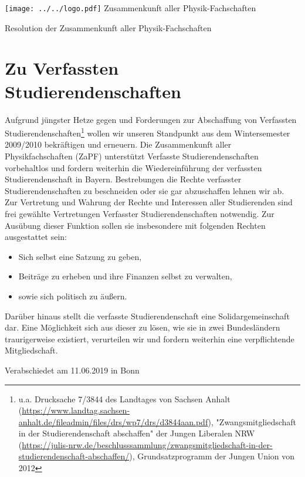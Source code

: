\documentclass[DIV=calc]{scrartcl}
\begin{document}
    \hspace{0.87\textwidth}
    \begin{minipage}{120pt}
        \vspace{-1.8cm}
        \texttt{[image: ../../logo.pdf]}
        \centering
        \small Zusammenkunft aller Physik-Fachschaften
    \end{minipage}
    \begin{center}
        \huge{Resolution der Zusammenkunft aller Physik-Fachschaften}\vspace{.25\baselineskip}\\
        \normalsize
    \end{center}
    \vspace{1cm}

\section*{Zu Verfassten Studierendenschaften}
Aufgrund jüngster Hetze gegen und Forderungen zur Abschaffung von Verfassten Studierendenschaften\footnote{u.a. Drucksache 7/3844 des Landtages von Sachsen Anhalt (\url{https://www.landtag.sachsen-anhalt.de/fileadmin/files/drs/wp7/drs/d3844aan.pdf}), "Zwangsmitgliedschaft in der Studierendenschaft abschaffen" der Jungen Liberalen NRW (\url{https://julis-nrw.de/beschlusssammlung/zwangsmitgliedschaft-in-der-studierendenschaft-abschaffen/}), Grundsatzprogramm der Jungen Union von 2012} wollen wir unseren Standpunkt aus dem Wintersemester 2009/2010 bekräftigen und erneuern.
Die Zusammenkunft aller Physikfachschaften (ZaPF) unterstützt Verfasste Studierendenschaften vorbehaltlos und fordern weiterhin die Wiedereinführung der verfassten Studierendenschaft in Bayern.
Bestrebungen die Rechte verfasster Studierendenschaften zu beschneiden oder sie gar abzuschaffen lehnen wir ab.\\

Zur Vertretung und Wahrung der Rechte und Interessen aller Studierenden sind frei gewählte Vertretungen
Verfasster Studierendenschaften notwendig. Zur Ausübung dieser Funktion sollen sie insbesondere mit
folgenden Rechten ausgestattet sein:\\
\begin{itemize}
\item Sich selbst eine Satzung zu geben,
\item Beiträge zu erheben und ihre Finanzen selbst zu verwalten,
\item sowie sich politisch zu äußern.
\end{itemize}
Darüber hinaus stellt die verfasste Studierendenschaft eine Solidargemeinschaft dar. Eine Möglichkeit sich
aus dieser zu lösen, wie sie in zwei Bundesländern traurigerweise existiert, verurteilen wir und fordern
weiterhin eine verpflichtende Mitgliedschaft.\\


\vspace*{\fill}
\begin{flushright}
Verabschiedet am 11.06.2019 in Bonn
\end{flushright}
\end{document}
